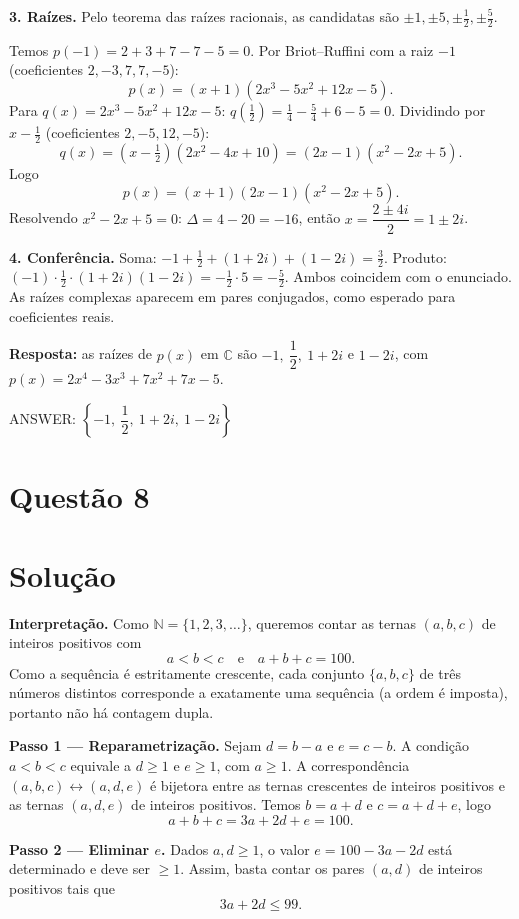 \documentclass{article}%
\begin{document}
\textbf{3. Raízes.} Pelo teorema das raízes racionais, as candidatas são $\pm1,\pm5,\pm\frac12,\pm\frac52$.

Temos $p(-1)=2+3+7-7-5=0$. Por Briot--Ruffini com a raiz $-1$ (coeficientes $2,-3,7,7,-5$):
\[
p(x)=(x+1)(2x^3-5x^2+12x-5).
\]
Para $q(x)=2x^3-5x^2+12x-5$: $q\!\left(\tfrac12\right)=\tfrac14-\tfrac54+6-5=0$. Dividindo por $x-\tfrac12$ (coeficientes $2,-5,12,-5$):
\[
q(x)=\left(x-\tfrac12\right)(2x^2-4x+10)=(2x-1)(x^2-2x+5).
\]
Logo
\[
p(x)=(x+1)(2x-1)(x^2-2x+5).
\]
Resolvendo $x^2-2x+5=0$: $\Delta=4-20=-16$, então $x=\dfrac{2\pm4i}{2}=1\pm2i$.

\textbf{4. Conferência.} Soma: $-1+\tfrac12+(1+2i)+(1-2i)=\tfrac32$. Produto: $(-1)\cdot\tfrac12\cdot(1+2i)(1-2i)=-\tfrac12\cdot5=-\tfrac52$. Ambos coincidem com o enunciado. As raízes complexas aparecem em pares conjugados, como esperado para coeficientes reais.

\textbf{Resposta:} as raízes de $p(x)$ em $\mathbb{C}$ são $-1,\ \dfrac12,\ 1+2i$ e $1-2i$, com $p(x)=2x^4-3x^3+7x^2+7x-5$.

ANSWER: $\left\{-1,\ \dfrac12,\ 1+2i,\ 1-2i\right\}$%
\newpage%
\section*{Questão 8}

\section*{Solução}

\textbf{Interpretação.} Como $\mathbb{N}=\{1,2,3,\ldots\}$, queremos contar as ternas $(a,b,c)$ de inteiros positivos com
\[
a<b<c \quad\text{e}\quad a+b+c=100 .
\]
Como a sequência é estritamente crescente, cada conjunto $\{a,b,c\}$ de três números distintos corresponde a exatamente uma sequência (a ordem é imposta), portanto não há contagem dupla.

\textbf{Passo 1 — Reparametrização.} Sejam $d=b-a$ e $e=c-b$. A condição $a<b<c$ equivale a $d\ge 1$ e $e\ge 1$, com $a\ge 1$. A correspondência $(a,b,c)\leftrightarrow(a,d,e)$ é bijetora entre as ternas crescentes de inteiros positivos e as ternas $(a,d,e)$ de inteiros positivos. Temos $b=a+d$ e $c=a+d+e$, logo
\[
a+b+c = 3a+2d+e = 100 .
\]

\textbf{Passo 2 — Eliminar $e$.} Dados $a,d\ge 1$, o valor $e=100-3a-2d$ está determinado e deve ser $\ge 1$. Assim, basta contar os pares $(a,d)$ de inteiros positivos tais que
\[
3a+2d\le 99 .
\]
\end{document}
